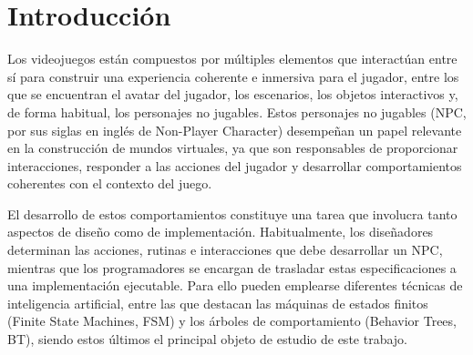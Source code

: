 \chapter{Introducción}
\label{cap:introduccion}




Los videojuegos están compuestos por múltiples elementos que interactúan entre sí para construir una experiencia coherente e inmersiva para el jugador, entre los que se encuentran el avatar del jugador, los escenarios, los objetos interactivos y, de forma habitual, los personajes no jugables.
Estos personajes no jugables (NPC, por sus siglas en inglés de Non-Player Character) desempeñan un papel relevante en la construcción de mundos virtuales, ya que son responsables de proporcionar interacciones, responder a las acciones del jugador y desarrollar comportamientos coherentes con el contexto del juego.

El desarrollo de estos comportamientos constituye una tarea que involucra tanto aspectos de diseño como de implementación.
Habitualmente, los diseñadores determinan las acciones, rutinas e interacciones que debe desarrollar un NPC, mientras que los programadores se encargan de trasladar estas especificaciones a una implementación ejecutable.
Para ello pueden emplearse diferentes técnicas de inteligencia artificial, entre las que destacan las máquinas de estados finitos (Finite State Machines, FSM) y los árboles de comportamiento (Behavior Trees, BT), siendo estos últimos el principal objeto de estudio de este trabajo.

